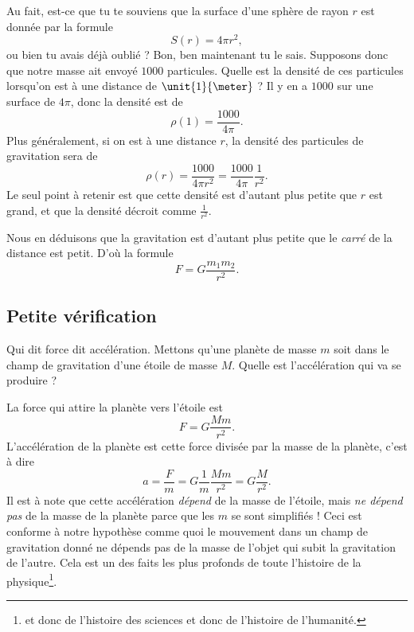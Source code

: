 Au fait, est-ce que tu te souviens que la surface d'une sphère de rayon $r$ est donnée par la formule
\begin{equation}
	S(r)=4\pi r^2,
\end{equation}
ou bien tu avais déjà oublié ? Bon, ben maintenant tu le sais. Supposons donc que notre masse ait envoyé $1000$ particules. Quelle est la densité de ces particules lorsqu'on est à une distance de $\unit{1}{\meter}$ ? Il y en a $1000$ sur une surface de $4\pi$, donc la densité est de
\begin{equation}
	\rho(1)=\frac{ 1000 }{ 4\pi }.
\end{equation}
Plus généralement, si on est à une distance $r$, la densité des particules de gravitation sera de 
\begin{equation}
	\rho(r)=\frac{ 1000 }{ 4\pi r^2 }=\frac{ 1000 }{ 4\pi }\frac{1}{ r^2 }.
\end{equation}
Le seul point à retenir est que cette densité est d'autant plus petite que $r$ est grand, et que la densité décroit comme $\frac{1}{ r^2 }$.

Nous en déduisons que la gravitation est d'autant plus petite que le \emph{carré} de la distance est petit. D'où la formule
\begin{equation}			\label{EqFormGravScal}
	F=G\frac{ m_1m_2 }{ r^2 }.
\end{equation}

\subsection{Petite vérification}

Qui dit force dit accélération. Mettons qu'une planète de masse $m$ soit dans le champ de gravitation d'une étoile de masse $M$. Quelle est l'accélération qui va se produire ?

La force qui attire la planète vers l'étoile est 
\begin{equation}
	F=G\frac{ Mm }{ r^2 }.
\end{equation}
L'accélération de la planète est cette force divisée par la masse de la planète, c'est à dire
\begin{equation}
	a=\frac{ F }{ m }=G\frac{1}{ m }\frac{ Mm }{ r^2 }=G\frac{ M }{ r^2 }.
\end{equation}
Il est à note que cette accélération \emph{dépend} de la masse de l'étoile, mais \emph{ne dépend pas} de la masse de la planète parce que les $m$ se sont simplifiés ! Ceci est conforme à notre hypothèse comme quoi le mouvement dans un champ de gravitation donné ne dépends pas de la masse de l'objet qui subit la gravitation de l'autre. Cela est un des faits les plus profonds de toute l'histoire de la physique\footnote{et donc de l'histoire des sciences et donc de l'histoire de l'humanité.}.

